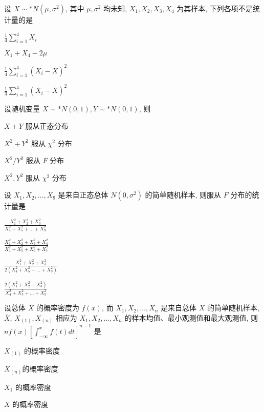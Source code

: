 \documentclass{exam-zh}
\begin{document}
\begin{question}
  设 $X \sim* N(\mu, \sigma^2)$, 其中 $\mu, \sigma^2$ 均未知, $X_1, X_2, X_3, X_4$ 为其样本, 下列各项不是统计量的是
  \paren[B]

  \begin{choices}
    \item $\frac{1}{4}\sum_{i=1}^{4}X_i$
    \item $X_1 + X_4 - 2\mu$
    \item $\frac{1}{4}\sum_{i=1}^{4}(X_i - \overline{X})^2$
    \item $\frac{1}{3}\sum_{i=1}^{4}(X_i - \overline{X})^2$
  \end{choices}
\end{question}

\begin{question}
  设随机变量 $X \sim* N(0, 1), Y \sim* N(0, 1)$, 则
  \paren[D]

  \begin{choices}
    \item $X + Y$ 服从正态分布
    \item $X^2 + Y^2$ 服从 $\chi^2$ 分布
    \item $X^2 / Y^2$ 服从 $F$ 分布
    \item $X^2, Y^2$ 服从 $\chi^2$ 分布
  \end{choices}
\end{question}

\begin{question}
  设 $X_1, X_2, \dots, X_9$ 是来自正态总体 $N(0, \sigma^2)$ 的简单随机样本, 则服从 $F$ 分布的统计量是
  \paren[D]

  \begin{choices}
    \item $\frac{X_1^2 + X_2^2 + X_3^2}{X_4^2 + X_5^2 + \dots + X_9^2}$
    \item $\frac{X_1^2 + X_2^2 + X_3^2 + X_4^2}{X_4^2 + X_5^2 + X_6^2 + X_7^2}$
    \item $\frac{X_1^2 + X_2^2 + X_3^2}{2(X_4^2 + X_5^2 + \dots + X_9^2)}$
    \item $\frac{2(X_1^2 + X_2^2 + X_3^2)}{X_4^2 + X_5^2 + \dots + X_9^2}$
  \end{choices}
\end{question}

\begin{question}
  设总体 $X$ 的概率密度为 $f(x)$, 而 $X_1, X_2, \dots, X_n$ 是来自总体 $X$ 的简单随机样本, $\overline{X}$, $X_{(1)}, X_{(n)}$ 相应为 $X_1, X_2, \dots, X_n$ 的样本均值、最小观测值和最大观测值, 则 $nf(x)\left[\int_{-\infty}^{x} f(t)dt\right]^{n-1}$ 是
  \paren[B]

  \begin{choices}
    \item $X_{(1)}$ 的概率密度
    \item $X_{(n)}$的概率密度
    \item $X_1$ 的概率密度
    \item $\overline{X}$ 的概率密度
  \end{choices}
\end{question}
\end{document}
